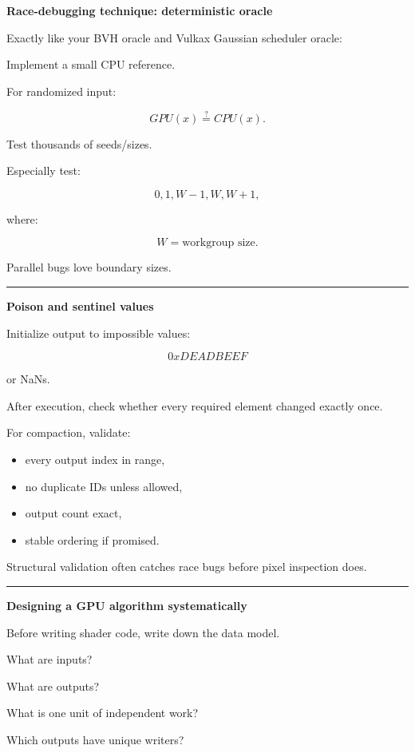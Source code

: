 \textbf{Race-debugging technique: deterministic oracle}

Exactly like your BVH oracle and Vulkax Gaussian scheduler oracle:

Implement a small CPU reference.

For randomized input:

\[
GPU(x)
\stackrel{?}{=}
CPU(x).
\]

Test thousands of seeds/sizes.

Especially test:

\[
0,
1,
W-1,
W,
W+1,
\]

where:

\[
W=\text{workgroup size}.
\]

Parallel bugs love boundary sizes.

\begin{center}\rule{0.5\linewidth}{0.5pt}\end{center}

\textbf{Poison and sentinel values}

Initialize output to impossible values:

\[
0xDEADBEEF
\]

or NaNs.

After execution, check whether every required element changed exactly once.

For compaction, validate:

\begin{itemize}
\tightlist
\item
  every output index in range,
\item
  no duplicate IDs unless allowed,
\item
  output count exact,
\item
  stable ordering if promised.
\end{itemize}

Structural validation often catches race bugs before pixel inspection does.

\begin{center}\rule{0.5\linewidth}{0.5pt}\end{center}

\textbf{Designing a GPU algorithm systematically}

Before writing shader code, write down the data model.

What are inputs?

What are outputs?

What is one unit of independent work?

Which outputs have unique writers?

